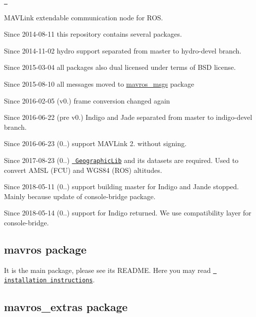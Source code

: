 \href{https://gitter.im/mavlink/mavros?utm_source=badge&utm_medium=badge&utm_campaign=pr-badge&utm_content=badge}{\texttt{ }}

M\+A\+V\+Link extendable communication node for R\+OS.


\begin{DoxyItemize}
\item Since 2014-\/08-\/11 this repository contains several packages.
\item Since 2014-\/11-\/02 hydro support separated from master to hydro-\/devel branch.
\item Since 2015-\/03-\/04 all packages also dual licensed under terms of B\+SD license.
\item Since 2015-\/08-\/10 all messages moved to \mbox{\hyperlink{namespacemavros__msgs}{mavros\+\_\+msgs}} package
\item Since 2016-\/02-\/05 (v0.) frame conversion changed again
\item Since 2016-\/06-\/22 (pre v0.) Indigo and Jade separated from master to indigo-\/devel branch.
\item Since 2016-\/06-\/23 (0..) support M\+A\+V\+Link 2. without signing.
\item Since 2017-\/08-\/23 (0..) \href{https://geographiclib.sourceforge.io/}{\texttt{ Geographic\+Lib}} and it\textquotesingle{}s datasets are required. Used to convert A\+M\+SL (F\+CU) and W\+G\+S84 (R\+OS) altitudes.
\item Since 2018-\/05-\/11 (0..) support building master for Indigo and Jande stopped. Mainly because update of console-\/bridge package.
\item Since 2018-\/05-\/14 (0..) support for Indigo returned. We use compatibility layer for console-\/bridge.
\end{DoxyItemize}

\subsection*{mavros package }

It is the main package, please see its R\+E\+A\+D\+ME. Here you may read \href{https://github.com/mavlink/mavros/blob/master/mavros/README.md\#installation}{\texttt{ installation instructions}}.

\subsection*{mavros\+\_\+extras package }

